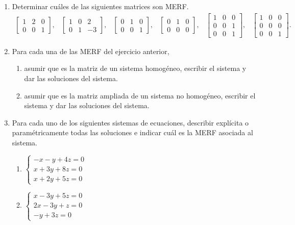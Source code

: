 \begin{enumerate}[topsep=6pt, itemsep=.4cm]
\item Determinar cuáles de las siguientes matrices son MERF.
$$\begin{array}{lccccl}
\begin{bmatrix}1 & 2 & 0 \\0 & 0 & 1 \end{bmatrix}, &
\begin{bmatrix}1 & 0 & 2 \\0 & 1 & -3 \end{bmatrix}, &
\begin{bmatrix}0 & 1 & 0 \\0 & 0 & 1 \end{bmatrix}, &
\begin{bmatrix}0 & 1 & 0 \\0 & 0 & 0 \end{bmatrix}, &
\begin{bmatrix}1 & 0 & 0  \\0 & 0 & 1 \\0 & 0 & 1 \end{bmatrix},&
\begin{bmatrix}1 & 0 & 0  \\0 & 0 & 0 \\0 & 0 & 1 \end{bmatrix}.
\end{array}$$



\item Para cada una de las MERF del ejercicio anterior,

\begin{enumerate}
\item
asumir que es la matriz de un sistema homogéneo, escribir el sistema
y dar las soluciones del sistema.

\item
asumir que es la matriz ampliada de un sistema no homogéneo, escribir el sistema
y dar las soluciones del sistema.
\end{enumerate}



\item\label{sistemas homogeneos} Para cada uno de los siguientes sistemas de ecuaciones, describir explícita o paramétricamente todas las soluciones e indicar cuál es la MERF asociada al sistema.

\begin{multicols}{2}
\begin{enumerate}
\item $\begin{cases}
 -x - y + 4z = 0\\
 x+3y+8z = 0\\
 x+2y + 5z = 0
\end{cases}$
\item $\begin{cases}
 x - 3y + 5z = 0\\
 2x-3y+z = 0\\
 -y + 3z = 0
\end{cases}$


\end{enumerate}
\end{multicols}
\end{enumerate}
